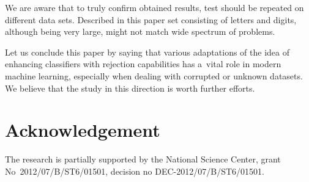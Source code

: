 \documentclass{llncs}
\begin{document}
We are aware that to truly confirm obtained results, test should be repeated on different data sets. Described in this paper set consisting of letters and digits, although being very large, might not match wide spectrum of problems. 

Let us conclude this paper by saying that various adaptations of the idea of enhancing classifiers with rejection capabilities has a~vital role in modern machine learning, especially when dealing with corrupted or unknown datasets. We believe that the study in this direction is worth further efforts.


\section*{Acknowledgement}

\noindent The research is partially supported  by the National Science Center, grant \\\mbox{No~2012/07/B/ST6/01501}, decision no \mbox{DEC-2012/07/B/ST6/01501}.
\end{document}
